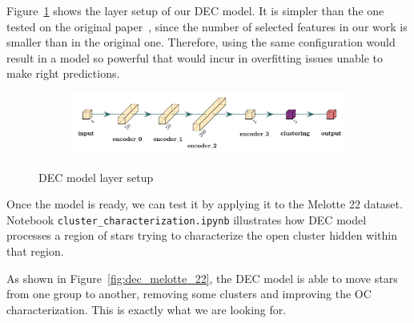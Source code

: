 \documentclass[11pt, a4paper, english]{book}
\begin{document}
Figure~\ref{fig:dec_model_setup} shows the layer setup of our DEC model.
It is simpler than the one tested on the original paper~\cite{xie2016unsupervised},
since the number of selected features in our work is smaller than in the original one.
Therefore, using the same configuration would result in a model so
powerful that would incur in overfitting issues unable to make right predictions.

\begin{figure}[htbp]
  \centering
  \begin{subfigure}{0.9\textwidth}
    \centering
    \includegraphics[width=\textwidth]{../figures/dec_diagram.pdf}
  \end{subfigure}
  \caption{DEC model layer setup}
  \label{fig:dec_model_setup}
\end{figure}

Once the model is ready, we can test it by applying it to the Melotte 22 dataset.
Notebook \verb|cluster_characterization.ipynb| illustrates how DEC model processes a region of stars
trying to characterize the open cluster hidden within that region.

As shown in Figure~\ref{fig:dec_melotte_22},
the DEC model is able to move stars from one group to another,
removing some clusters and improving the OC characterization.
This is exactly what we are looking for.
\end{document}
